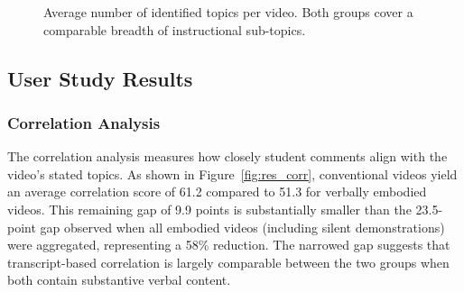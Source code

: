 \begin{figure}[h!]
    \centering
    \caption{Average number of identified topics per video. Both groups cover a comparable breadth of instructional sub-topics.}
    \label{fig:res_topics}
\end{figure}

\subsection{User Study Results}

\subsubsection{Correlation Analysis}
The correlation analysis measures how closely student comments align with the video's stated topics. As shown in Figure~\ref{fig:res_corr}, conventional videos yield an average correlation score of 61.2 compared to 51.3 for verbally embodied videos. This remaining gap of 9.9 points is substantially smaller than the 23.5-point gap observed when all embodied videos (including silent demonstrations) were aggregated, representing a 58\% reduction. The narrowed gap suggests that transcript-based correlation is largely comparable between the two groups when both contain substantive verbal content.


